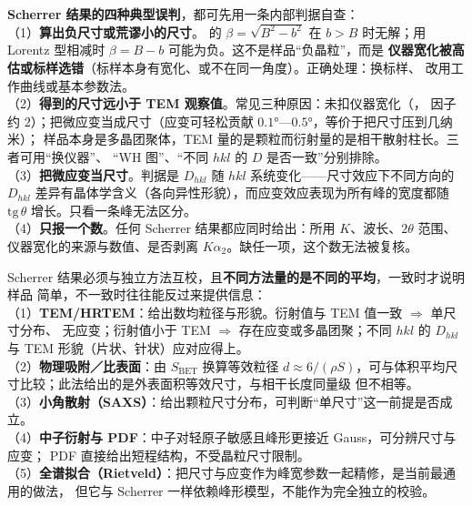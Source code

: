 \begin{pitfall}
\textbf{Scherrer 结果的四种典型误判}，都可先用一条内部判据自查：\\
（1）\textbf{算出负尺寸或荒谬小的尺寸}。 的 $\beta=\sqrt{B^{2}-b^{2}}$
在 $b>B$ 时无解；用 Lorentz 型相减时 $\beta=B-b$ 可能为负。这不是样品``负晶粒''，而是
\textbf{仪器宽化被高估或标样选错}（标样本身有宽化、或不在同一角度）。正确处理：换标样、
改用工作曲线或基本参数法。\\
（2）\textbf{得到的尺寸远小于 TEM 观察值}。常见三种原因：未扣仪器宽化（，
因子约 $2$）；把微应变当成尺寸（应变可轻松贡献 $0.1°$—$0.5°$，等价于把尺寸压到几纳米）；
样品本身是多晶团聚体，TEM 量的是颗粒而衍射量的是相干散射柱长。三者可用``换仪器''、
``WH 图''、``不同 $hkl$ 的 $D$ 是否一致''分别排除。\\
（3）\textbf{把微应变当尺寸}。判据是 $D_{hkl}$ 随 $hkl$ 系统变化——尺寸效应下不同方向的
$D_{hkl}$ 差异有晶体学含义（各向异性形貌），而应变效应表现为所有峰的宽度都随
$\mathrm{tg}\,\theta$ 增长。只看一条峰无法区分。\\
（4）\textbf{只报一个数}。任何 Scherrer 结果都应同时给出：所用 $K$、波长、$2\theta$ 范围、
仪器宽化的来源与数值、是否剥离 $K\alpha_{2}$。缺任一项，这个数无法被复核。
\end{pitfall}

\begin{crosscheck}
Scherrer 结果必须与独立方法互校，且\textbf{不同方法量的是不同的平均}，一致时才说明样品
简单，不一致时往往能反过来提供信息：\\
（1）\textbf{TEM/HRTEM}：给出数均粒径与形貌。衍射值与 TEM 值一致 $\Rightarrow$ 单尺寸分布、
无应变；衍射值小于 TEM $\Rightarrow$ 存在应变或多晶团聚；不同 $hkl$ 的 $D_{hkl}$ 与 TEM
形貌（片状、针状）应对应得上。\\
（2）\textbf{物理吸附／比表面}：由 $S_{\mathrm{BET}}$ 换算等效粒径
$d\approx6/(\rho S)$，可与体积平均尺寸比较；此法给出的是外表面积等效尺寸，与相干长度同量级
但不相等。\\
（3）\textbf{小角散射（SAXS）}：给出颗粒尺寸分布，可判断``单尺寸''这一前提是否成立。\\
（4）\textbf{中子衍射与 PDF}：中子对轻原子敏感且峰形更接近 Gauss，可分辨尺寸与应变；
PDF 直接给出短程结构，不受晶粒尺寸限制。\\
（5）\textbf{全谱拟合（Rietveld）}：把尺寸与应变作为峰宽参数一起精修，是当前最通用的做法，
但它与 Scherrer 一样依赖峰形模型，不能作为完全独立的校验。
\end{crosscheck}

